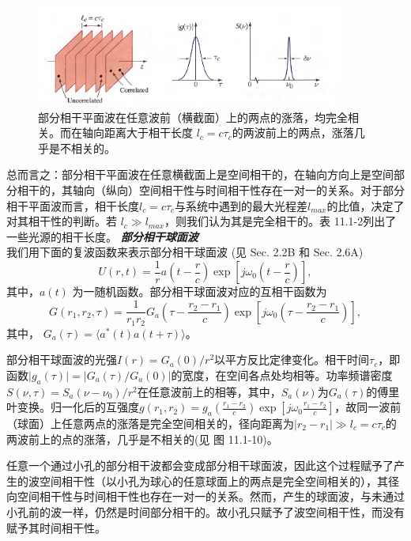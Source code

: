 \documentclass[UTF8]{ctexart}
\numberwithin{figure}{subsection}
\numberwithin{table}{subsection}
\begin{document}
 \begin{figure}[H]
\centering
\includegraphics[width=0.9\textwidth]{11_1_9.PNG}
\caption{部分相干平面波在任意波前（横截面）上的两点的涨落，均完全相关。而在轴向距离大于相干长度 $ l_c = c \tau_c $的两波前上的两点，涨落几乎是不相关的。}
\label{fig: 11_1_9}
\end{figure}
\par 总而言之：部分相干平面波在任意横截面上是空间相干的，在轴向方向上是空间部分相干的，其轴向（纵向）空间相干性与时间相干性存在一对一的关系。对于部分相干平面波而言，相干长度$ l_c = c\tau_c $与系统中遇到的最大光程差$ l_{max} $的比值，决定了对其相干性的判断。若 $ l_c \gg l_{max} $，则我们认为其是完全相干的。表 11.1-2列出了一些光源的相干长度。
\bigbreak\noindent\textcolor{ksc}{\textbf{\textsl{部分相干球面波}}}\\
我们用下面的复波函数来表示部分相干球面波 (见 Sec. 2.2B 和 Sec. 2.6A)
\begin{equation}
U(r, t) = \frac{1}{r} a(t - \frac{r}{c}) \exp[j\omega_0 (t - \frac{r}{c})],
\end{equation}
其中，$ a(t) $ 为一随机函数。部分相干球面波对应的互相干函数为
\begin{equation}
G(r_1, r_2, \tau) = \frac{1}{r_1 r_2} G_a (\tau - \frac{r_2 - r_1}{c}) \exp [j\omega_0 (\tau - \frac{r_2 - r_1}{c})],
\end{equation}
其中， $ G_a (\tau) = \langle a^\ast (t) a(t+ \tau) \rangle $。
\par 部分相干球面波的光强$ I(r) = G_a (0) / r^2 $以平方反比定律变化。相干时间$ \tau_c $，即函数$ \lvert g_a (\tau) \rvert = \lvert G_a (\tau) / G_a (0) \rvert $的宽度，在空间各点处均相等。功率频谱密度$S(\nu, \tau) = S_a (\nu - \nu_0) / r^2$在任意波前上的相等，其中，$S_a(\nu)$为$G_a (\tau)$的傅里叶变换。归一化后的互强度$g(r_1, r_2) = g_a (\frac{r_1 - r_2}{c})\exp [j\omega_0 \frac{r_1 - r_2}{c}]$，故同一波前（球面）上任意两点的涨落是完全空间相关的，径向距离为$ \lvert r_2 -r_1 \rvert \gg l_c = c\tau_c $的两波前上的点的涨落，几乎是不相关的(见 图 11.1-10)。
\par 任意一个通过小孔的部分相干波都会变成部分相干球面波，因此这个过程赋予了产生的波空间相干性（以小孔为球心的任意球面上的两点是完全空间相关的），其径向空间相干性与时间相干性也存在一对一的关系。然而，产生的球面波，与未通过小孔前的波一样，仍然是时间部分相干的。故小孔只赋予了波空间相干性，而没有赋予其时间相干性。
\end{document}
